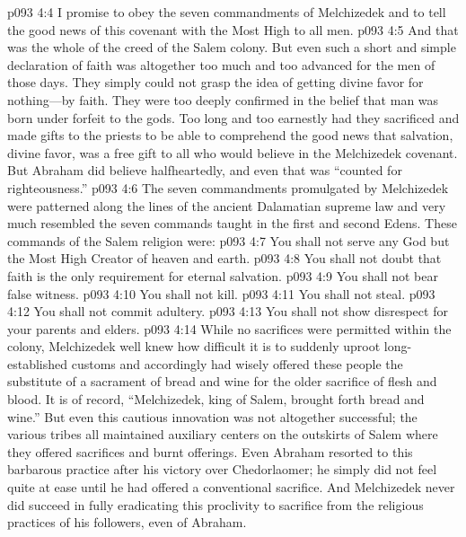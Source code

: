 \vs p093 4:4 \bibnobreakspace I promise to obey the seven commandments of Melchizedek and to tell the good news of this covenant with the Most High to all men.
\pc \vs p093 4:5 And that was the whole of the creed of the Salem colony. But even such a short and simple declaration of faith was altogether too much and too advanced for the men of those days. They simply could not grasp the idea of getting divine favor for nothing---by faith. They were too deeply confirmed in the belief that man was born under forfeit to the gods. Too long and too earnestly had they sacrificed and made gifts to the priests to be able to comprehend the good news that salvation, divine favor, was a free gift to all who would believe in the Melchizedek covenant. But Abraham did believe halfheartedly, and even that was “counted for righteousness.”
\pc \vs p093 4:6 The seven commandments promulgated by Melchizedek were patterned along the lines of the ancient Dalamatian supreme law and very much resembled the seven commands taught in the first and second Edens. These commands of the Salem religion were:
\pc \vs p093 4:7 \bibnobreakspace You shall not serve any God but the Most High Creator of heaven and earth.
\vs p093 4:8 \bibnobreakspace You shall not doubt that faith is the only requirement for eternal salvation.
\vs p093 4:9 \bibnobreakspace You shall not bear false witness.
\vs p093 4:10 \bibnobreakspace You shall not kill.
\vs p093 4:11 \bibnobreakspace You shall not steal.
\vs p093 4:12 \bibnobreakspace You shall not commit adultery.
\vs p093 4:13 \bibnobreakspace You shall not show disrespect for your parents and elders.
\pc \vs p093 4:14 While no sacrifices were permitted within the colony, Melchizedek well knew how difficult it is to suddenly uproot long\hyp{}established customs and accordingly had wisely offered these people the substitute of a sacrament of bread and wine for the older sacrifice of flesh and blood. It is of record, “Melchizedek, king of Salem, brought forth bread and wine.” But even this cautious innovation was not altogether successful; the various tribes all maintained auxiliary centers on the outskirts of Salem where they offered sacrifices and burnt offerings. Even Abraham resorted to this barbarous practice after his victory over Chedorlaomer; he simply did not feel quite at ease until he had offered a conventional sacrifice. And Melchizedek never did succeed in fully eradicating this proclivity to sacrifice from the religious practices of his followers, even of Abraham.
